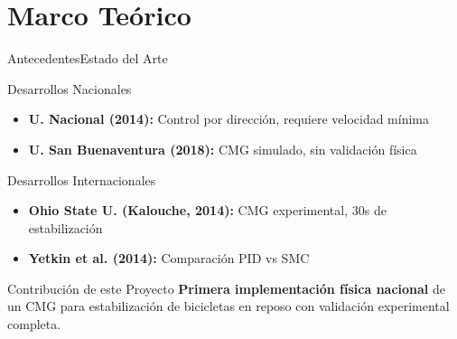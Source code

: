\documentclass[10pt,xcolor={dvipsnames}]{beamer}
\begin{document}
\section{Marco Teórico}
\begin{frame}{Antecedentes}{Estado del Arte}

\begin{block}{Desarrollos Nacionales}
\begin{itemize}
    \item \textbf{U. Nacional (2014):} Control por dirección, requiere velocidad mínima
    \item \textbf{U. San Buenaventura (2018):} CMG simulado, sin validación física
\end{itemize}
\end{block}

\begin{block}{Desarrollos Internacionales}
\begin{itemize}
    \item \textbf{Ohio State U. (Kalouche, 2014):} CMG experimental, 30s de estabilización
    \item \textbf{Yetkin et al. (2014):} Comparación PID vs SMC
\end{itemize}
\end{block}

\begin{alertblock}{Contribución de este Proyecto}
\textbf{Primera implementación física nacional} de un CMG para estabilización de bicicletas en reposo con validación experimental completa.
\end{alertblock}
\end{frame}
\end{document}
